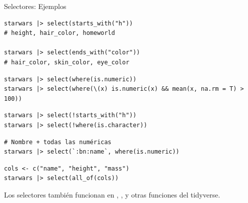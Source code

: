\documentclass[8pt]{beamer}
\begin{document}
\begin{frame}[fragile]{Selectores: Ejemplos}
\begin{lstlisting}[style=RScript]
starwars |> select(starts_with("h"))
# height, hair_color, homeworld

starwars |> select(ends_with("color"))
# hair_color, skin_color, eye_color
\end{lstlisting}

\begin{lstlisting}[style=RScript]
starwars |> select(where(is.numeric))
starwars |> select(where(\(x) is.numeric(x) && mean(x, na.rm = T) > 100))
\end{lstlisting}

\begin{lstlisting}[style=RScript]
starwars |> select(!starts_with("h"))
starwars |> select(!where(is.character))
\end{lstlisting}

\begin{lstlisting}[style=RScript]
# Nombre + todas las numéricas
starwars |> select(`:bn:name`, where(is.numeric))
\end{lstlisting}
\end{frame}





\begin{frame}[fragile]
\begin{lstlisting}[style=RScript]
cols <- c("name", "height", "mass")
starwars |> select(all_of(cols))
\end{lstlisting}

\begin{alertblock}{}
Los selectores también funcionan en , ,  y otras funciones del tidyverse.
\end{alertblock}
\end{frame}
\end{document}
